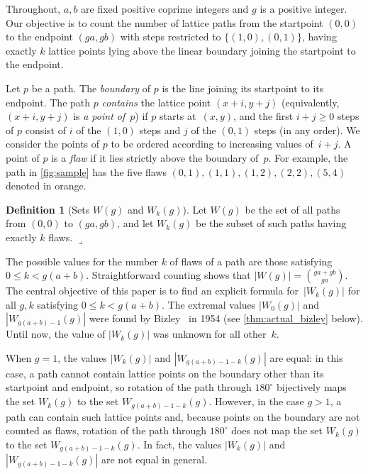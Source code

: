 \documentclass[11pt]{article}
\newcommand{\lrcornerqed}[0]{}
\renewcommand{\lrcornerqed}[0]{\hfill $\lrcorner$} %
\theoremstyle{definition} %
\newtheorem{definition}[thm]{Definition}
\numberwithin{equation}{section}
\begin{document}
Throughout, $a,b$ are fixed positive coprime integers and $g$ is a positive integer.
Our objective is to count the number of lattice paths from the startpoint $(0,0)$ to the endpoint $(ga,gb)$ with steps  restricted to $\{(1,0), (0,1)\}$, having exactly $k$ lattice points lying above the linear boundary joining the startpoint to the endpoint. 

Let $p$ be a path.
The \textit{boundary} of $p$ is the line joining its startpoint to its endpoint. 
The path $p$ \textit{contains} the lattice point $(x+i,y+j)$ (equivalently,
$(x+i,y+j)$ is \textit{a point of}~$p$)
if $p$ starts at~$(x,y)$, and the first $i+j\ge 0$ steps of $p$ consist of $i$ of the $(1,0)$ steps and $j$  of the $(0,1)$ steps (in any order). 
We consider the points of $p$ to be ordered according to increasing values of~$i+j$.
A point of $p$ is a \textit{flaw} if it lies strictly above the boundary of~$p$.
For example, the path in \cref{fig:sample} has the five flaws $(0,1),(1,1),(1,2),(2,2),(5,4)$ denoted in orange.

\begin{definition}[Sets $W(g)$ and $W_k(g)$]\label{def:path_sets}
    Let $W(g)$ be the set of all paths from $(0,0)$ to $(ga,gb)$, and let $W_k(g)$ be the subset of such paths having exactly $k$ flaws. \lrcornerqed
\end{definition}


The possible values for the number $k$ of flaws of a path are those satisfying $0\le k<g(a+b)$. 
Straightforward counting shows that $|W(g)| = \binom{ga+gb}{ga}$.
The central objective of this paper is to find an explicit formula for~$|W_k(g)|$ for all $g,k$ satisfying $0\le k<g(a+b)$.  The extremal values $|W_0(g)|$ and $|W_{g(a+b)-1}(g)|$ were found by Bizley~\cite{biz} in 1954 (see \cref{thm:actual_bizley} below). 
Until now, the value of $|W_k(g)|$ was unknown for all other~$k$.

When $g=1$, the values $|W_k(g)|$ and $|W_{g(a+b)-1-k}(g)|$ are equal: in this case, a path cannot contain lattice points on the boundary other than its startpoint and endpoint, so rotation of the path through $180^\circ$ bijectively maps the set $W_k(g)$ to the set $W_{g(a+b)-1-k}(g)$. 
However, in the case $g>1$, a path can contain such lattice points and, 
because points on the boundary are not counted as flaws, rotation of the path through $180^\circ$ does not map the set $W_k(g)$ to the set $W_{g(a+b)-1-k}(g)$. In fact, the values $|W_k(g)|$ and $|W_{g(a+b)-1-k}(g)|$ are not equal in general.
\end{document}
